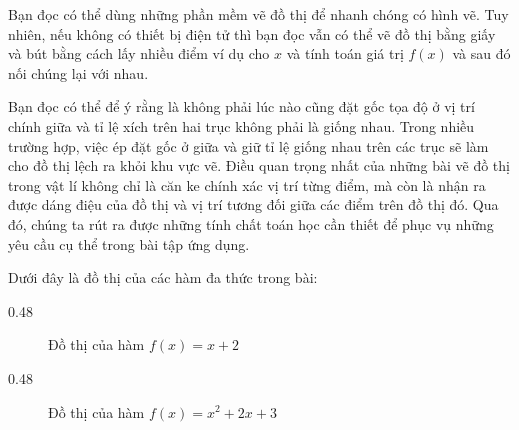 \solution

Bạn đọc có thể dùng những phần mềm vẽ đồ thị để nhanh chóng có hình vẽ. Tuy nhiên, nếu không có thiết bị điện tử thì bạn đọc vẫn có thể vẽ đồ thị bằng giấy và bút bằng cách lấy nhiều điểm ví dụ cho $x$ và tính toán giá trị $f(x)$ và sau đó nối chúng lại với nhau.

Bạn đọc có thể để ý rằng là không phải lúc nào cũng đặt gốc tọa độ ở vị trí chính giữa và tỉ lệ xích trên hai trục không phải là giống nhau. Trong nhiều trường hợp, việc ép đặt gốc ở giữa và giữ tỉ lệ giống nhau trên các trục sẽ làm cho đồ thị lệch ra khỏi khu vực vẽ. Điều quan trọng nhất của những bài vẽ đồ thị trong vật lí không chỉ là căn ke chính xác vị trí từng điểm, mà còn là nhận ra được dáng điệu của đồ thị và vị trí tương đối giữa các điểm trên đồ thị đó. Qua đó, chúng ta rút ra được những tính chất toán học cần thiết để phục vụ những yêu cầu cụ thể trong bài tập ứng dụng.

Dưới đây là đồ thị của các hàm đa thức trong bài:

{
   \begin{minipageindent}{0.48\textwidth}
      \begin{figure}[H]
         \centering
         \caption{Đồ thị của hàm $f(x) = x + 2$}
         \label{fig:ham_so:ham_da_thuc:x_2}
      \end{figure}
   \end{minipageindent}
   \hfill
   \begin{minipageindent}{0.48\textwidth}
      \begin{figure}[H]
         \centering
         \caption{Đồ thị của hàm $f(x) = x^2 + 2x + 3$}
         \label{fig:ham_so_mot_bien:da_thuc:x2_2x_3}
      \end{figure}
   \end{minipageindent}
}

